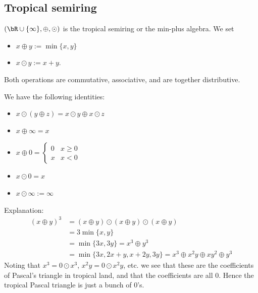 \subsection{Tropical semiring}
\begin{defn}\label{defn:tropical-semiring}
  $(\bR\cup \{\infty\}, \oplus, \odot)$ is the tropical semiring or the min-plus algebra. We set
  \begin{itemize}
    \item $x \oplus y := \min\{x,y\}$
    \item $x\odot y := x + y$.
  \end{itemize}
  Both operations are commutative, associative, and are together distributive.
\end{defn}
We have the following identities:
\begin{itemize}
  \item $x \odot (y\oplus z) = x\odot y \oplus x\odot z$
  \item $x \oplus \infty = x$
  \item $x \oplus 0 = \begin{cases}0 & x \geq 0 \\ x & x< 0\end{cases}$
  \item $x \odot 0 = x$
  \item $x \odot \infty := \infty$
\end{itemize}

Explanation:
\begin{align*}
  (x\oplus y)^3 &= (x \oplus y) \odot (x \oplus y) \odot (x \oplus y) \\
                &= 3 \min\{x,y\} \\
                &= \min\{3x,3y\} = x^3 \oplus y^3 \\
                &= \min\{3x,2x+y,x+2y,3y\} = x^3 \oplus x^2y \oplus xy^2 \oplus y^3
\end{align*}
Noting that $x^3 = 0\odot x^3$, $x^2y = 0\odot x^2y$, etc. we see that these are the coefficients of Pascal's triangle in tropical land, and that the coefficients are all 0. Hence the tropical Pascal triangle is just a bunch of 0's.

